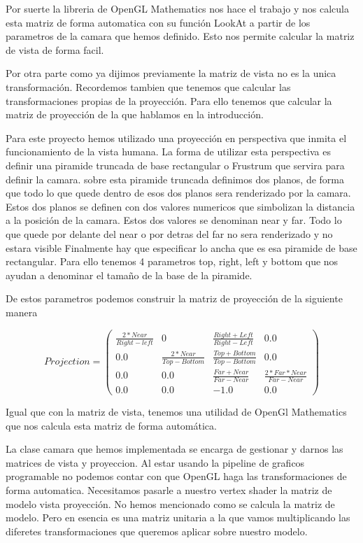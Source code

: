 Por suerte la libreria de OpenGL Mathematics nos hace el trabajo y nos calcula esta matriz de forma automatica con su función LookAt a partir de los parametros de la camara que hemos definido. Esto nos permite calcular la matriz de vista de forma facil.

Por otra parte como ya dijimos previamente la matriz de vista no es la unica transformación. Recordemos tambien que tenemos que calcular las transformaciones propias de la proyección. Para ello tenemos que calcular la matriz de proyección de la que hablamos en la introducción.

Para este proyecto hemos utilizado una proyección en perspectiva que inmita el funcionamiento de la vista humana. La forma de utilizar esta perspectiva es definir una piramide truncada de base rectangular o Frustrum que servira para definir la camara.
sobre esta piramide truncada definimos dos planos, de forma que todo lo que quede dentro de esos dos planos sera renderizado por la camara. Estos dos planos se definen con dos valores numericos que simbolizan la distancia a la posición de la camara.
Estos dos valores se denominan near y far. Todo lo que quede por delante del near o por detras del far no sera renderizado y no estara visible Finalmente hay que especificar lo ancha que es esa piramide de base rectangular. Para ello tenemos 4 parametros
top, right, left y bottom que nos ayudan a denominar el tamaño de la base de la piramide.

De estos parametros podemos construir la matriz de proyección de la siguiente manera \cite{ibmGlFrustumSubroutine}

$$ {Projection}=  \begin{pmatrix}
    \frac{2*{Near}}{{Right}-{left}} & 0 & \frac{{Right}+{Left}}{{Right}-{Left}} & 0.0 \\
    0.0 & \frac{2*{Near}}{{Top}-{Bottom}} & \frac{{Top}+{Bottom}}{{Top}-{Bottom}} & 0.0 \\
    0.0 & 0.0 & \frac{{Far}+{Near}}{{Far}-{Near}} & \frac{2*{Far}*{Near}}{{Far}-{Near}} \\
    0.0 & 0.0 & -1.0 & 0.0 
    \end{pmatrix} $$

Igual que con la matriz de vista, tenemos una utilidad de OpenGl Mathematics que nos calcula esta matriz de forma automática.

La clase camara que hemos implementada se encarga de gestionar y darnos las matrices de vista y proyeccion. Al estar usando la pipeline de graficos programable no podemos contar con que OpenGL haga las transformaciones de forma automatica.
Necesitamos pasarle a nuestro vertex shader la matriz de modelo vista proyección. No hemos mencionado como se calcula la matriz de modelo. Pero en esencia es una matriz unitaria a la que vamos multiplicando las diferetes transformaciones 
que queremos aplicar sobre nuestro modelo.

